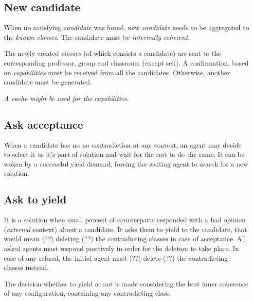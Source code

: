 \documentclass{article}
\begin{document}
\subsection{New candidate}
When no satisfying \emph{candidate} was found, new \emph{candidate}
needs to be aggregated to the \emph{known classes}.
The candidate must be \emph{internally coherent}.

The newly created \emph{classes} (of which consists a candidate) are
sent to the corresponding professor, group and classroom (except self).
A confirmation, based on \emph{capabilities} must be received from all
the candidates. Otherwise, another candidate must be generated.

\textit{A cache might be used for the capabilities.}


\subsection{Ask acceptance}
When a candidate has no no contradiction at any context, an agent may decide to
select it as it's part of solution and wait for the rest to do the same.
It can be woken by a successful yield demand, forcing the waiting agent to
search for a new solution.


\subsection{Ask to yield}
It is a solution when small percent of counterparts responded with a bad
opinion (\emph{external} context) about a candidate. It asks them to yield
to the candidate, that would mean (??) deleting (??) the contradicting classes
in case of acceptance.  All asked agents must respond positively in order for
the deletion to take place. In case of any refusal, the initial agent must
(??) delete (??) the contradicting classes instead.

The decision whether to yield or not is made considering the best inner
coherence of any configuration, containing any contradicting class.
\end{document}
